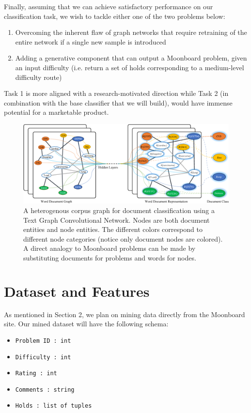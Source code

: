 \documentclass{article}
\begin{document}
Finally, assuming that we can achieve satisfactory performance on our classification task, we wish to tackle either one of the two problems below:

\begin{enumerate}
\setlength\itemsep{0.1em}
\item Overcoming the inherent flaw of graph networks that require retraining of the entire network if a single new sample is introduced
\item Adding a generative component that can output a Moonboard problem, given an input difficulty (i.e. return a set of holds corresponding to a medium-level difficulty route)
\end{enumerate}

Task 1 is more aligned with a research-motivated direction while Task 2 (in combination with the base classifier that we will build), would have immense potential for a marketable product. 

\begin{figure}
\centering
\includegraphics[width=.8\linewidth]{textGCN}
\caption{A heterogenous corpus graph for document classification using a Text Graph Convolutional Network. Nodes are both document entities and node entities. The different colors correspond to different node categories (notice only document nodes are colored). A direct analogy to Moonboard problems can be made by substituting documents for problems and words for nodes.}
\label{fig: Corpus graph for Text Graph Convolutional Network}
\end{figure}

\section{Dataset and Features}
As mentioned in Section 2, we plan on mining data directly from the Moonboard site. Our mined dataset will have the following schema:

\begin{itemize}
\setlength\itemsep{0.1em}
\item \texttt{Problem ID : int}
\item \texttt{Difficulty : int}
\item \texttt{Rating : int}
\item \texttt{Comments : string}
\item \texttt{Holds : list of tuples}
\end{itemize}
\end{document}
